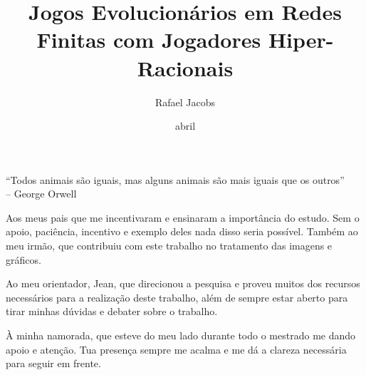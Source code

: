 \documentclass[masters]{./config/PPGMAp}
\title{Jogos Evolucionários em Redes Finitas com Jogadores Hiper-Racionais}
\date{abril}{2021}
\author[o]{Rafael Jacobs}{Kehl}
\theoremstyle{definition}
\begin{document}

%
%
\frontmatter %

	\coversheet

	\catalogsheet

	\approvalsheet

	\begin{epigraph}[0.5]
		{``Todos animais são iguais, mas alguns animais são mais iguais que os outros''} \\ \vspace{.25cm}
        \hfill -- George Orwell
	\end{epigraph}

	\begin{acknowledgments}
		Aos meus pais que me incentivaram e ensinaram a importância do estudo. Sem o apoio, paciência, incentivo e exemplo deles nada disso seria possível. Também ao meu irmão, que contribuiu com este trabalho no tratamento das imagens e gráficos.
		
		Ao meu orientador, Jean, que direcionou a pesquisa e proveu muitos dos recursos necessários para a realização deste trabalho, além de sempre estar aberto para tirar minhas dúvidas e debater sobre o trabalho.  
		
		À minha namorada, que esteve do meu lado durante todo o mestrado me dando apoio e atenção. Tua presença sempre me acalma e me dá a clareza necessária para seguir em frente.
	\end{acknowledgments}

	\tableofcontents

	\listoffigures

	\listoftables

	\printnomenclature
\end{document}
